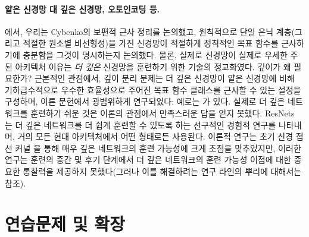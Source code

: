 \documentclass[../../book-main_ko.tex]{subfiles}
\begin{document}
\paragraph{얕은 신경망 대 깊은 신경망, 오토인코딩 등.} 에서, 우리는 Cybenko의 보편적 근사 정리를 논의했고, 원칙적으로 단일 은닉 계층(그리고 적절한 원소별 비선형성)을 가진 신경망이 적절하게 정칙적인 목표 함수를 근사하기에 충분함을 그것이 명시하는지 논의했다. 물론, 실제로 신경망이 실제로 우세한 주된 아키텍처 이유는 \textit{더 깊은} 신경망을 훈련하기 위한 기술의 정교화였다.
깊이가 왜 필요한가?
근본적인 관점에서, 깊이 분리 문제는 더 깊은 신경망이 얕은 신경망에 비해 기하급수적으로 우수한 효율성으로 주어진 목표 함수 클래스를 근사할 수 있는 설정을 구성하며, 이론 문헌에서 광범위하게 연구되었다: 예로는 \cite{Telgarsky2016-sn,Bresler2020-xy,Venturi2021-qc}가 있다.
실제로 더 깊은 네트워크를 훈련하기 쉬운 것은 이론의 관점에서 만족스러운 답을 얻지 못했다.
ResNets \cite{he2016deep}는 더 깊은 네트워크를 더 쉽게 훈련할 수 있도록 하는 선구적인 경험적 연구를 나타내며, 거의 모든 현대 아키텍처에서 어떤 형태로든 사용된다. 이론적 연구는 초기 신경 접선 커널 \cite{Buchanan2021-sj,Martens2021-cx}을 통해 매우 깊은 네트워크의 훈련 가능성에 크게 초점을 맞추었지만, 이러한 연구는 훈련의 중간 및 후기 단계에서 더 깊은 네트워크의 훈련 가능성 이점에 대한 중요한 통찰력을 제공하지 못했다(그러나 이를 해결하려는 연구 라인의 뿌리에 대해서는 \cite{Yang2021-gw} 참조).

\section{연습문제 및 확장}
\end{document}
